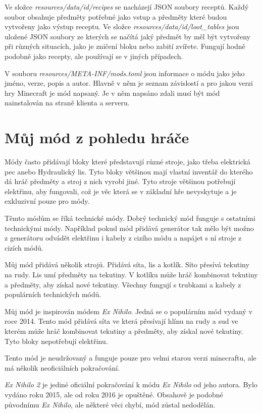 \documentclass[FM,RP]{tulthesis}
\begin{document}
\par Ve složce \textit{resources/data/id/recipes} se nacházejí JSON soubory receptů. Každý soubor obsahuje předměty potřebné jako vstup a předměty které budou vytvořeny jako výstup receptu.
Ve složce \textit{resources/data/id/loot\_tables} jsou uložené JSON soubory ze kterých se načítá jaký předmět by měl být vytvořeny při různých situacích, jako je zničení bloku nebo zabití zvířete. Fungují hodně podobně jako recepty, ale používají se v jiných případech.
\par V souboru \textit{resources/META-INF/mods.toml} jsou informace o módu jako jeho jméno, verze, popis a autor. Hlavně v něm je seznam závislostí a pro jakou verzi hry Minecraft je mód napsaný. Je v něm napsáno zdali musí být mód nainstalován na straně klienta a serveru. 

\chapter{Můj mód z pohledu hráče}
\par  Módy často přidávají bloky které představují různé stroje, jako třeba elektrická pec anebo Hydraulický lis. Tyto bloky většinou mají vlastní inventář do kterého dá hráč předměty a stroj z nich vyrobí jiné. Tyto stroje většinou potřebují elektřinu, aby fungovali, což je věc která se v základní hře nevyskytuje a je exkluzivní pouze pro módy.
 \par   Těmto módům se říká technické módy. Dobrý technický mód funguje s ostatními technickými módy. Například pokud mód přidává generátor tak mělo být možno z generátoru odvádět elektřinu i kabely z cizího módu a napájet s ní stroje z cizích módů. 
 \par   Můj mód přidává několik strojů. Přidává síta, lis a kotlík. Síto přesívá tekutiny na rudy. Lis umí předměty na tekutiny. V kotlíku může hráč kombinovat tekutiny a předměty, aby získal nové tekutiny.  Všechny fungují s trubkami a kabely z populárních technických módů.
\par    Můj mód je inspirován módem\textit{ Ex Nihilo}. Jedná se o populárním mód vydaný v roce 2014. Tento mód přidává síta ve která přesívají hlínu na rudy a sud ve kterém může hráč kombinovat tekutiny a předměty, aby získal nové tekutiny. Tyto bloky nepotřebují elektřinu.
 \par   Tento mód je neudržovaný a funguje pouze pro velmi starou verzi minecraftu, ale má několik neoficiálních pokračování. 
 \par       \textit{Ex Nihilo 2} je jediné oficiální pokračování k módu \textit{ Ex Nihilo} od jeho autora. Bylo vydáno roku 2015, ale od roku 2016 je opuštěné. Obsahově je podobné původnímu \textit{Ex Nihilo}, ale některé věci chybí, mód zůstal nedodělán.
\end{document}

